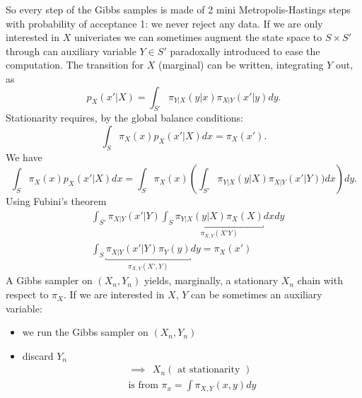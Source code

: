 \documentclass{article}
\begin{document}
	So every step of the Gibbs samples is made of 2 mini Metropolis-Hastings steps with probability of acceptance 1: we never reject any data. If we are only interested in $X$ univeriates we can sometimes augment the state space to $S\times S'$ through can auxiliary variable $Y\in S'$ paradoxally introduced to ease the computation. The transition for $X$ (marginal) can be written, integrating $Y$ out, as \[
	p_X(x'|X)=\int_{S'}\pi_{Y|X}(y|x)\pi_{X|Y}(x'|y)dy.
	\]
	Stationarity requires, by the global balance conditions:
	\[
	\int_S\pi_X(x)p_X(x'|X)dx=\pi_X(x').
	\]
	We have
	\[
	\int_{S}\pi_{X}(x)p_X(x'|X)dx=\int_S\pi_X(x)\left(\int_{S'}\pi_{Y|X}(y|X)\pi_{X|Y}(x'|Y))dx\right)dy.
	\]
	Using Fubini's theorem
	\begin{align*}
		&\int_{S'} \pi_{X|Y}(x'|Y)\int_S\underbracket{\pi_{Y|X}(y|X)\pi_X(X)}_{\pi_{X,Y}(X'Y)}dxdy\\
		&\int_S \underbracket{\pi_{X|Y}(x'|Y)\pi_{Y}(y)}_{\pi_{X,Y}(X',Y)}dy=\pi_X(x')
	\end{align*}
	A Gibbs sampler on $(X_n,Y_n)$ yields, marginally, a stationary $X_n$ chain with respect to $\pi_X$.
	If we are interested in $X$, $Y$ can be sometimes an auxiliary variable: \\
	\begin{itemize}
		\item we run the Gibbs sampler on $(X_n, Y_n)$
		\item discard $Y_n$
		\begin{equation*}
			\begin{split}
				\implies \ \ X_n (\text{ at stationarity })\\
				\text{is from }\pi_x = \int \pi_{X,Y}(x,y)dy
			\end{split}
		\end{equation*}
	\end{itemize}
\end{document}

